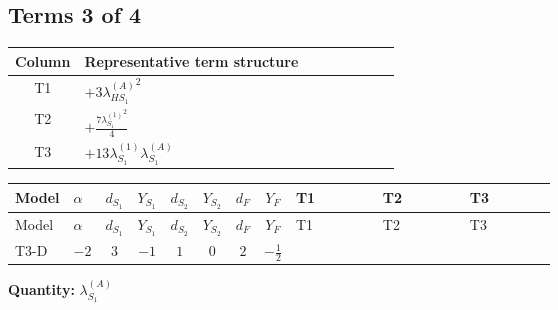 \documentclass[8pt]{article}
\begin{document}
\begin{landscape}
\subsection*{Terms 3 of 4}
\begin{center}
\begin{tabular}{@{}c >{\raggedright\arraybackslash}p{0.82\linewidth}@{}}
\toprule
Column & Representative term structure \\
\midrule
T1 & \(\displaystyle +3 {\lambda_{HS_1}^{(A)}}^2\) \\
\midrule
T2 & \(\displaystyle +\frac{7 {\lambda_{S_1}^{(1)}}^2}{4}\) \\
\midrule
T3 & \(\displaystyle +13 {\lambda_{S_1}^{(1)}} {\lambda_{S_1}^{(A)}}\) \\
\midrule
\bottomrule
\end{tabular}
\end{center}
\smallskip
\tiny
\begin{longtable}{@{}llcccccc >{\raggedright\arraybackslash}p{0.21\linewidth} >{\raggedright\arraybackslash}p{0.21\linewidth} >{\raggedright\arraybackslash}p{0.21\linewidth}@{}}
\toprule
Model & $\alpha$ & $d_{S_1}$ & $Y_{S_1}$ & $d_{S_2}$ & $Y_{S_2}$ & $d_F$ & $Y_F$ & T1 & T2 & T3 \\
\midrule
\endfirsthead
\toprule
Model & $\alpha$ & $d_{S_1}$ & $Y_{S_1}$ & $d_{S_2}$ & $Y_{S_2}$ & $d_F$ & $Y_F$ & T1 & T2 & T3 \\
\midrule
\endhead
T3-D & $-2$ & $3$ & $-1$ & $1$ & $0$ & $2$ & $-\frac{1}{2}$ & \scriptsize\adjustbox{max width=\linewidth}{$\begin{gathered} +3 {\lambda_{HS_1}^{(A)}}^2\end{gathered}$} & \scriptsize\adjustbox{max width=\linewidth}{$\begin{gathered} +\frac{7 {\lambda_{S_1}^{(1)}}^2}{4}\end{gathered}$} & \scriptsize\adjustbox{max width=\linewidth}{$\begin{gathered} +13 {\lambda_{S_1}^{(1)}} {\lambda_{S_1}^{(A)}}\end{gathered}$} \\
\midrule
\bottomrule
\end{longtable}
\clearpage
\noindent\textbf{Quantity: }$\lambda_{S_1}^{(A)}$\par\smallskip

\end{landscape}
\end{document}

